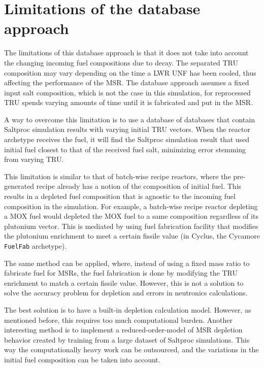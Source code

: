 
\section{Limitations of the database approach}
The limitations of this database approach is that it does not
take into account the changing incoming fuel compositions due to decay.
The separated \gls{TRU} composition may vary depending on the time
a \gls{LWR} \gls{UNF} has been cooled, thus affecting the performance
of the \gls{MSR}. The database approach assumes a fixed input salt
composition, which is not the case in this simulation, for reprocessed
\gls{TRU} spends varying amounts of time until it is fabricated and
put in the \gls{MSR}.

A way to overcome this limitation is to use a database of databases 
that contain Saltproc simulation results with varying initial \gls{TRU}
vectors. When the reactor archetype receives the fuel, it will find the
Saltproc simulation result that used initial fuel closest to that
of the received fuel salt, minimizing error stemming from varying
\gls{TRU}.

This limitation is similar to that of batch-wise recipe reactors, where the 
pre-generated recipe already has a notion of the composition of initial fuel.
This results in a depleted fuel composition that is agnostic to the incoming
fuel composition in the simulation. For example, a batch-wise recipe reactor
depleting a \gls{MOX} fuel would depleted the \gls{MOX} fuel to a same
composition regardless of its plutonium vector. This is mediated by using
fuel fabrication facility that modifies the plutonium enrichment to
meet a certain fissile value (in Cyclus, the Cycamore \texttt{FuelFab} archetype).

The same method can be applied, where, instead of using a fixed mass ratio
to fabricate fuel for \glspl{MSR}, the fuel fabrication is done by modifying
the \gls{TRU} enrichment to match a certain fissile value. However, this is
not a solution to solve the accuracy problem for depletion and errors
in neutronics calculations.

The best solution is to have a built-in depletion calculation model. However,
as mentioned before, this requires too much computational burden. Another
interesting method is to implement a reduced-order-model of \gls{MSR} depletion
behavior created by training from a large dataset of Saltproc simulations. This
way the computationally heavy work can be outsourced, and the variations
in the initial fuel composition can be taken into account.